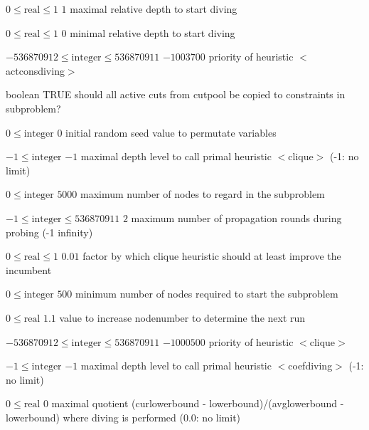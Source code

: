 %
{$0\leq\textrm{real}\leq1$}%
{$1$}%
{maximal relative depth to start diving}%
{}

%
{$0\leq\textrm{real}\leq1$}%
{$0$}%
{minimal relative depth to start diving}%
{}

%
{$-536870912\leq\textrm{integer}\leq536870911$}%
{$-1003700$}%
{priority of heuristic $<$actconsdiving$>$}%
{}

%
{boolean}%
{TRUE}%
{should all active cuts from cutpool be copied to constraints in subproblem?}%
{}

%
{$0\leq\textrm{integer}$}%
{$0$}%
{initial random seed value to permutate variables }%
{}

%
{$-1\leq\textrm{integer}$}%
{$-1$}%
{maximal depth level to call primal heuristic $<$clique$>$ (-1: no limit)}%
{}

%
{$0\leq\textrm{integer}$}%
{$5000$}%
{maximum number of nodes to regard in the subproblem}%
{}

%
{$-1\leq\textrm{integer}\leq536870911$}%
{$2$}%
{maximum number of propagation rounds during probing (-1 infinity)}%
{}

%
{$0\leq\textrm{real}\leq1$}%
{$0.01$}%
{factor by which clique heuristic should at least improve the incumbent  }%
{}

%
{$0\leq\textrm{integer}$}%
{$500$}%
{minimum number of nodes required to start the subproblem}%
{}

%
{$0\leq\textrm{real}$}%
{$1.1$}%
{value to increase nodenumber to determine the next run}%
{}

%
{$-536870912\leq\textrm{integer}\leq536870911$}%
{$-1000500$}%
{priority of heuristic $<$clique$>$}%
{}

%
{$-1\leq\textrm{integer}$}%
{$-1$}%
{maximal depth level to call primal heuristic $<$coefdiving$>$ (-1: no limit)}%
{}

%
{$0\leq\textrm{real}$}%
{$0$}%
{maximal quotient (curlowerbound - lowerbound)/(avglowerbound - lowerbound) where diving is performed (0.0: no limit)}%
{}

